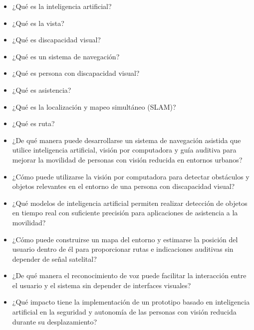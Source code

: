 \begin{itemize}
    \item ¿Qué es la inteligencia artificial?
    \item ¿Qué es la vista?
    \item ¿Qué es discapacidad visual?
    \item ¿Qué es un sistema de navegación?
    \item ¿Qué es persona con discapacidad visual?
    \item ¿Qué es asistencia?
    \item ¿Qué es la localización y mapeo simultáneo (SLAM)?
    \item ¿Qué es ruta?
    \item ¿De qué manera puede desarrollarse un sistema de navegación asistida que utilice inteligencia artificial, visión por computadora y guía auditiva para mejorar la movilidad de personas con visión reducida en entornos urbanos?
    \item ¿Cómo puede utilizarse la visión por computadora para detectar obstáculos y objetos relevantes en el entorno de una persona con discapacidad visual?
    \item ¿Qué modelos de inteligencia artificial permiten realizar detección de objetos en tiempo real con suficiente precisión para aplicaciones de asistencia a la movilidad?
    \item ¿Cómo puede construirse un mapa del entorno y estimarse la posición del usuario dentro de él para proporcionar rutas e indicaciones auditivas sin depender de señal satelital?
    \item ¿De qué manera el reconocimiento de voz puede facilitar la interacción entre el usuario y el sistema sin depender de interfaces visuales?
    \item ¿Qué impacto tiene la implementación de un prototipo basado en inteligencia artificial en la seguridad y autonomía de las personas con visión reducida durante su desplazamiento?
\end{itemize}